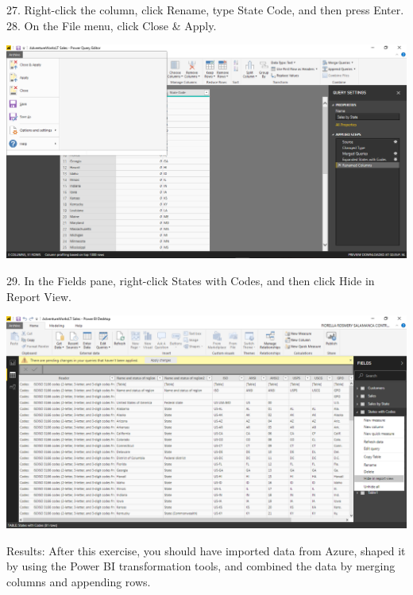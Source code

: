 27. Right-click the column, click Rename, type State Code, and then press Enter.\\
28. On the File menu, click Close \& Apply.\\

	\begin{center}
	\includegraphics[width=17cm]{./Imagenes/Ejercicio1/Tarea4/18}
	\end{center}	

29. In the Fields pane, right-click States with Codes, and then click Hide in Report View.\\

	\begin{center}
	\includegraphics[width=17cm]{./Imagenes/Ejercicio1/Tarea4/19}
	\end{center}	

Results: After this exercise, you should have imported data from Azure, shaped it by using the Power BI
transformation tools, and combined the data by merging columns and appending rows.\\